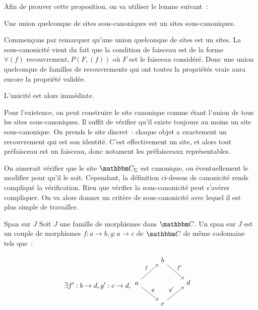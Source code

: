 \begin{pv}
    Afin de prouver cette proposition, on va utiliser le lemme suivant~:

    \begin{lem}
        Une union quelconque de sites sous-canoniques est un sites sous-canoniques.
    \end{lem}
    \begin{pv}
        Commençons par remarquer qu'une union quelconque de sites est un sites.
        La sous-canonicité vient du fait que la condition de faisceau est de la
        forme $\forall (f)\text{ recouvrement}, P(F,(f))$ où $F$ est le
        faisceau considéré.  Donc une union quelconque de familles de
        recouvrements qui ont toutes la propriétés vraie aura encore la
        propriété validée.
    \end{pv}

    L'unicité est alors immédiate.

    Pour l'existence, on peut construire le site canonique comme étant l'union
    de tous les sites sous-canoniques. Il suffit de vérifier qu'il existe toujours
    au moins un site sous-canonique. On prends le site discret~: chaque objet a
    exactement un recouvrement qui est son identité. C'est effectivement un site,
    et alors tout préfaisceau est un faisceau, donc notament les préfaisceaux
    représentables.
\end{pv}

On aimerait vérifier que le site $\C_\Sigma$ est canonique, ou éventuellement le modifier
pour qu'il le soit. Cependant, la définition ci-dessus de canonicité rends compliqué
la vérification. Rien que vérifier la sous-canonicité peut s'avérer compliquer. On
va alors donner un critère de sous-canonicité avec lequel il est plus simple de
travailler.

\begin{defi}{Span sur $J$}
    Soit $J$ une famille de morphismes dans $\C$. Un span sur $J$ est un couple de
    morphismes $f:a\rightarrow b,g:a\rightarrow c$ de $\C$ de même codomaine tels que~:

    \[\exists f':b\rightarrow d, g':c\rightarrow d,\begin{tikzcd}
        & b \arrow[rd, "f'"] & \\
        a \arrow[ru, "f"] \arrow[rd, "g"] & & d \\
        & c \arrow[ru, "g'"] & \\
    \end{tikzcd}\]
\end{defi}

